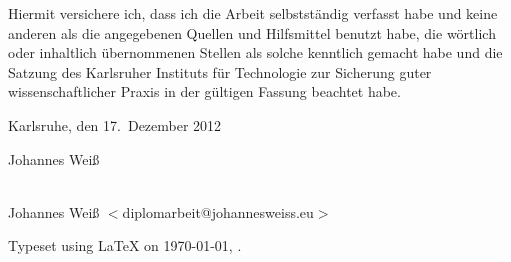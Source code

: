 \cleardoublepage{}

\thispagestyle{empty}

\vspace*{\fill}


\bigskip{}

\noindent{}Hiermit versichere ich, dass ich die Arbeit selbstst\"andig verfasst
habe und keine anderen als die angegebenen Quellen und Hilfsmittel benutzt habe,
die w\"ortlich oder inhaltlich \"ubernommenen Stellen als solche kenntlich
gemacht habe und die Satzung des Karlsruher Instituts f\"ur Technologie zur
Sicherung guter wissenschaftlicher Praxis in der g\"ultigen Fassung beachtet
habe.

\bigskip{}

Karlsruhe, den 17.\ Dezember 2012

\bigskip{}

\bigskip{}

\bigskip{}

Johannes Wei\ss

\vspace*{\fill}

\cleardoublepage

\thispagestyle{empty}

\vspace*{\fill}
\begin{center}
{\Large \JWtitle{}} \\
Johannes Wei\ss{} $<$diplomarbeit@johannesweiss.eu$>$
\end{center}
\vspace*{\fill}

\newpage
\thispagestyle{empty}

\null
\vfill
\hfill Typeset using \LaTeX{} on \today{}, \currenttime{}.

